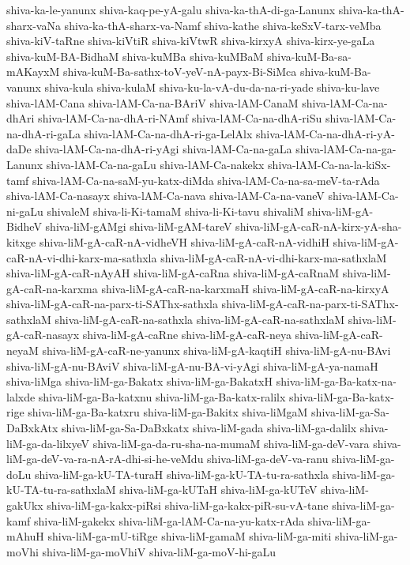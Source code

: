 {shiva-ka-le-yanunx
shiva-kaq-pe-yA-galu
shiva-ka-thA-di-ga-Lanunx
shiva-ka-thA-sharx-vaNa
shiva-ka-thA-sharx-va-Namf
shiva-kathe
shiva-keSxV-tarx-veMba
shiva-kiV-taRne
shiva-kiVtiR
shiva-kiVtwR
shiva-kirxyA
shiva-kirx-ye-gaLa
shiva-kuM-BA-BidhaM
shiva-kuMBa
shiva-kuMBaM
shiva-kuM-Ba-sa-mAKayxM
shiva-kuM-Ba-sathx-toV-yeV-nA-payx-Bi-SiMca
shiva-kuM-Ba-vanunx
shiva-kula
shiva-kulaM
shiva-ku-la-vA-du-da-na-ri-yade
shiva-ku-lave
shiva-lAM-Cana
shiva-lAM-Ca-na-BAriV
shiva-lAM-CanaM
shiva-lAM-Ca-na-dhAri
shiva-lAM-Ca-na-dhA-ri-NAmf
shiva-lAM-Ca-na-dhA-riSu
shiva-lAM-Ca-na-dhA-ri-gaLa
shiva-lAM-Ca-na-dhA-ri-ga-LelAlx
shiva-lAM-Ca-na-dhA-ri-yA-daDe
shiva-lAM-Ca-na-dhA-ri-yAgi
shiva-lAM-Ca-na-gaLa
shiva-lAM-Ca-na-ga-Lanunx
shiva-lAM-Ca-na-gaLu
shiva-lAM-Ca-nakekx
shiva-lAM-Ca-na-la-kiSx-tamf
shiva-lAM-Ca-na-saM-yu-katx-diMda
shiva-lAM-Ca-na-sa-meV-ta-rAda
shiva-lAM-Ca-nasayx
shiva-lAM-Ca-nava
shiva-lAM-Ca-na-vaneV
shiva-lAM-Ca-ni-gaLu
shivaleM
shiva-li-Ki-tamaM
shiva-li-Ki-tavu
shivaliM
shiva-liM-gA-BidheV
shiva-liM-gAMgi
shiva-liM-gAM-tareV
shiva-liM-gA-caR-nA-kirx-yA-sha-kitxge
shiva-liM-gA-caR-nA-vidheVH
shiva-liM-gA-caR-nA-vidhiH
shiva-liM-gA-caR-nA-vi-dhi-karx-ma-sathxla
shiva-liM-gA-caR-nA-vi-dhi-karx-ma-sathxlaM
shiva-liM-gA-caR-nAyAH
shiva-liM-gA-caRna
shiva-liM-gA-caRnaM
shiva-liM-gA-caR-na-karxma
shiva-liM-gA-caR-na-karxmaH
shiva-liM-gA-caR-na-kirxyA
shiva-liM-gA-caR-na-parx-ti-SAThx-sathxla
shiva-liM-gA-caR-na-parx-ti-SAThx-sathxlaM
shiva-liM-gA-caR-na-sathxla
shiva-liM-gA-caR-na-sathxlaM
shiva-liM-gA-caR-nasayx
shiva-liM-gA-caRne
shiva-liM-gA-caR-neya
shiva-liM-gA-caR-neyaM
shiva-liM-gA-caR-ne-yanunx
shiva-liM-gA-kaqtiH
shiva-liM-gA-nu-BAvi
shiva-liM-gA-nu-BAviV
shiva-liM-gA-nu-BA-vi-yAgi
shiva-liM-gA-ya-namaH
shiva-liMga
shiva-liM-ga-Bakatx
shiva-liM-ga-BakatxH
shiva-liM-ga-Ba-katx-na-lalxde
shiva-liM-ga-Ba-katxnu
shiva-liM-ga-Ba-katx-ralilx
shiva-liM-ga-Ba-katx-rige
shiva-liM-ga-Ba-katxru
shiva-liM-ga-Bakitx
shiva-liMgaM
shiva-liM-ga-Sa-DaBxkAtx
shiva-liM-ga-Sa-DaBxkatx
shiva-liM-gada
shiva-liM-ga-dalilx
shiva-liM-ga-da-lilxyeV
shiva-liM-ga-da-ru-sha-na-mumaM
shiva-liM-ga-deV-vara
shiva-liM-ga-deV-va-ra-nA-rA-dhi-si-he-veMdu
shiva-liM-ga-deV-va-ranu
shiva-liM-ga-doLu
shiva-liM-ga-kU-TA-turaH
shiva-liM-ga-kU-TA-tu-ra-sathxla
shiva-liM-ga-kU-TA-tu-ra-sathxlaM
shiva-liM-ga-kUTaH
shiva-liM-ga-kUTeV
shiva-liM-gakUkx
shiva-liM-ga-kakx-piRsi
shiva-liM-ga-kakx-piR-su-vA-tane
shiva-liM-ga-kamf
shiva-liM-gakekx
shiva-liM-ga-lAM-Ca-na-yu-katx-rAda
shiva-liM-ga-mAhuH
shiva-liM-ga-mU-tiRge
shiva-liM-gamaM
shiva-liM-ga-miti
shiva-liM-ga-moVhi
shiva-liM-ga-moVhiV
shiva-liM-ga-moV-hi-gaLu
}
